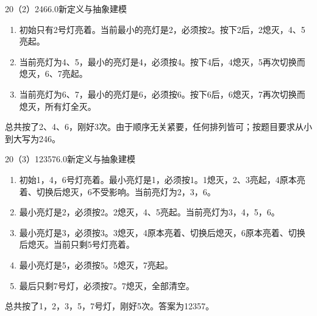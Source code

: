 \begin{solution}{20（2）}{246}{6.0}{新定义与抽象建模}
\begin{enumerate}[label=\textbf{Step \arabic*:},leftmargin=*]
  \item 初始只有2号灯亮着。当前最小的亮灯是2，必须按2。按下2后，2熄灭，4、5亮起。
  \item 当前亮灯为4、5，最小的亮灯是4，必须按4。按下4后，4熄灭，5再次切换而熄灭，6、7亮起。
  \item 当前亮灯为6、7，最小的亮灯是6，必须按6。按下6后，6熄灭，7再次切换而熄灭，所有灯全灭。
\end{enumerate}
总共按了2、4、6，刚好3次。由于顺序无关紧要，任何排列皆可；按题目要求从小到大写为246。
\end{solution}

\begin{solution}{20（3）}{12357}{6.0}{新定义与抽象建模}
\begin{enumerate}[label=\textbf{Step \arabic*:},leftmargin=*]
  \item 初始1，4，6号灯亮着。最小亮灯是1，必须按1。1熄灭，2、3亮起，4原本亮着、切换后熄灭，6不受影响。当前亮灯为2，3，6。
  \item 最小亮灯是2，必须按2。2熄灭，4、5亮起。当前亮灯为3，4，5，6。
  \item 最小亮灯是3，必须按3。3熄灭，4原本亮着、切换后熄灭，6原本亮着、切换后熄灭。当前只剩5号灯亮着。
  \item 最小亮灯是5，必须按5。5熄灭，7亮起。
  \item 最后只剩7号灯，必须按7。7熄灭，全部清空。
\end{enumerate}
总共按了1，2，3，5，7号灯，刚好5次。答案为12357。
\end{solution}

